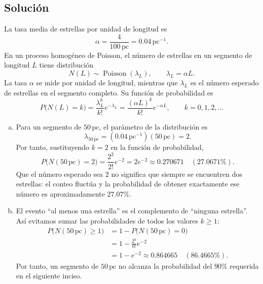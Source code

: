 \documentclass[a4paper]{article}
\begin{document}
\subsection{Solución}

La tasa media de estrellas por unidad de longitud es
$$
\alpha=\frac{4}{100\,\mathrm{pc}}=0.04\,\mathrm{pc}^{-1}.
$$
En un proceso homogéneo de Poisson, el número de estrellas en un segmento de longitud $L$ tiene distribución
$$
N(L)\sim\operatorname{Poisson}(\lambda_L),
\qquad \lambda_L=\alpha L.
$$
La tasa $\alpha$ se mide por unidad de longitud, mientras que $\lambda_L$ es el número esperado de estrellas en el segmento completo. Su función de probabilidad es
$$
P\bigl(N(L)=k\bigr)=\frac{\lambda_L^k}{k!}e^{-\lambda_L}
=\frac{(\alpha L)^k}{k!}e^{-\alpha L},
\qquad k=0,1,2,\ldots
$$

\begin{enumerate}[a)]
\item Para un segmento de $50\,\mathrm{pc}$, el parámetro de la distribución es
$$
\lambda_{50\,\mathrm{pc}}=(0.04\,\mathrm{pc}^{-1})(50\,\mathrm{pc})=2.
$$
Por tanto, sustituyendo $k=2$ en la función de probabilidad,
$$
P\bigl(N(50\,\mathrm{pc})=2\bigr)
=\frac{2^2}{2!}e^{-2}
=2e^{-2}
\approx\boxed{0.270671\quad(27.0671\%)}.
$$
Que el número esperado sea $2$ no significa que siempre se encuentren dos estrellas: el conteo fluctúa y la probabilidad de obtener exactamente ese número es aproximadamente $27.07\%$.

\item El evento ``al menos una estrella'' es el complemento de ``ninguna estrella''. Así evitamos sumar las probabilidades de todos los valores $k\ge1$:
\begin{align*}
P\bigl(N(50\,\mathrm{pc})\ge1\bigr)
&=1-P\bigl(N(50\,\mathrm{pc})=0\bigr)\\
&=1-\frac{2^0}{0!}e^{-2}\\
&=1-e^{-2}
\approx\boxed{0.864665\quad(86.4665\%)}.
\end{align*}
Por tanto, un segmento de $50\,\mathrm{pc}$ no alcanza la probabilidad del $90\%$ requerida en el siguiente inciso.




\end{enumerate}
\end{document}
